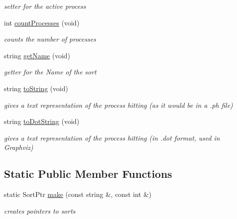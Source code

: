 \begin{DoxyCompactItemize}
\begin{DoxyCompactList}\small\item\em setter for the active process \end{DoxyCompactList}\item 
int \hyperlink{class_sort_a1f91b39f9d5d05ffbf59a1480102e85c}{count\-Processes} (void)
\begin{DoxyCompactList}\small\item\em counts the number of processes \end{DoxyCompactList}\item 
\hypertarget{class_sort_aae171b005c3dada51b7a302230ff501a}{string \hyperlink{class_sort_aae171b005c3dada51b7a302230ff501a}{get\-Name} (void)}\label{class_sort_aae171b005c3dada51b7a302230ff501a}

\begin{DoxyCompactList}\small\item\em getter for the \-Name of the sort \end{DoxyCompactList}\item 
string \hyperlink{class_sort_ae160613fb2d5c7fd9818a5c7d4be992a}{to\-String} (void)
\begin{DoxyCompactList}\small\item\em gives a text representation of the process hitting (as it would be in a .ph file) \end{DoxyCompactList}\item 
string \hyperlink{class_sort_a9bb67cd444d217dd477c896a31d869a0}{to\-Dot\-String} (void)
\begin{DoxyCompactList}\small\item\em gives a text representation of the process hitting (in .dot format, used in \-Graphviz) \end{DoxyCompactList}\end{DoxyCompactItemize}
\subsection*{\-Static \-Public \-Member \-Functions}
\begin{DoxyCompactItemize}
\item 
static \-Sort\-Ptr \hyperlink{class_sort_a9c3fa1c3b71839c425d99a7fa86a9cc2}{make} (const string \&, const int \&)
\begin{DoxyCompactList}\small\item\em creates pointers to sorts \end{DoxyCompactList}\end{DoxyCompactItemize}
